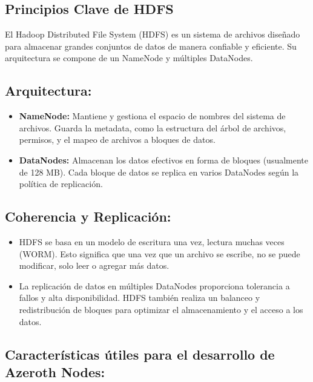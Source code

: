 \subsection{Principios Clave de HDFS}

El Hadoop Distributed File System (HDFS) es un sistema de archivos diseñado para almacenar grandes conjuntos de datos de manera confiable y eficiente. Su arquitectura se compone de un NameNode y múltiples DataNodes.

\subsection{Arquitectura:}

\begin{itemize}
    \item \textbf{NameNode:} Mantiene y gestiona el espacio de nombres del sistema de archivos. Guarda la metadata, como la estructura del árbol de archivos, permisos, y el mapeo de archivos a bloques de datos.
    \item \textbf{DataNodes:} Almacenan los datos efectivos en forma de bloques (usualmente de 128 MB). Cada bloque de datos se replica en varios DataNodes según la política de replicación.
\end{itemize}

\subsection{Coherencia y Replicación:}

\begin{itemize}
    \item HDFS se basa en un modelo de escritura una vez, lectura muchas veces (WORM). Esto significa que una vez que un archivo se escribe, no se puede modificar, solo leer o agregar más datos.
    \item La replicación de datos en múltiples DataNodes proporciona tolerancia a fallos y alta disponibilidad. HDFS también realiza un balanceo y redistribución de bloques para optimizar el almacenamiento y el acceso a los datos.
\end{itemize}

\subsection{Características útiles para el desarrollo de Azeroth Nodes:}


